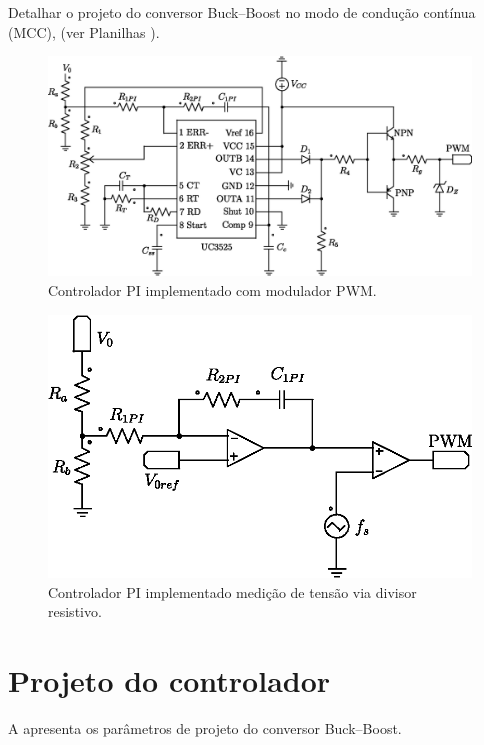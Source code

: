 Detalhar o projeto do conversor Buck--Boost \cite{inep-cccc-2006} no modo de condução contínua (MCC), (ver Planilhas \cite{noauthor_ptc_nodate}).

\begin{figure}[!h]
	\centering
	\includegraphics[width=0.85\linewidth]{Figs/PWM}
	\caption{Controlador PI implementado com modulador PWM.}
	\label{fig:PWM}
\end{figure}



\begin{figure}[!h]
	\centering
	\includegraphics[width=0.85\linewidth]{Figs/PWM-PI}
	\caption{Controlador PI implementado medição de tensão via divisor resistivo.}
	\label{fig:PI-PWM}
\end{figure}



\section{Projeto do controlador}

A  apresenta os parâmetros de projeto do conversor Buck--Boost.

